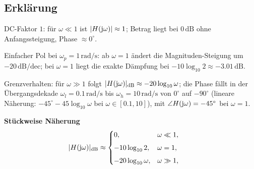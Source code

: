 \subsection{Erklärung}
\vspace{5mm}
\begin{description}[leftmargin=1.2em,labelsep=.6em,font=\bfseries]
\item[Schritt 1] DC-Faktor $1$: für $\omega\ll1$ ist $|H(\operatorname{j}\!\omega)|\approx1$; Betrag liegt bei $0\,\mathrm{dB}$ ohne Anfangssteigung, Phase $\approx0^\circ$.
\item[Schritt 2] Einfacher Pol bei $\omega_p=1\,\mathrm{rad/s}$: ab $\omega=1$ ändert die Magnituden-Steigung um $-20\,\mathrm{dB/dec}$; bei $\omega=1$ liegt die exakte Dämpfung bei $-10\log_{10}2\approx-3.01\,\mathrm{dB}$.
\item[Schritt 3] Grenzverhalten: für $\omega\gg1$ folgt $|H(\operatorname{j}\!\omega)|_{\mathrm{dB}}\approx-20\log_{10}\omega$; die Phase fällt in der Übergangsdekade $\omega_l=0.1\,\mathrm{rad/s}$ bis $\omega_h=10\,\mathrm{rad/s}$ von $0^\circ$ auf $-90^\circ$ (lineare Näherung: $-45^\circ-45\log_{10}\omega$ bei $\omega\in[0.1,10]$), mit $\angle H(\operatorname{j}\!\omega)= -45^\circ$ bei $\omega=1$.
\end{description}

\vspace{0.5cm}
\medskip
\noindent\textbf{Stückweise Näherung}
\[
|H(\operatorname{j}\!\omega)|_{\mathrm{dB}}\approx
\begin{cases}
0,& \omega\ll1,\\[4pt]
-10\log_{10}2,& \omega=1,\\[4pt]
-20\log_{10}\omega,& \omega\gg1,
\end{cases}
\qquad
\]
\newpage